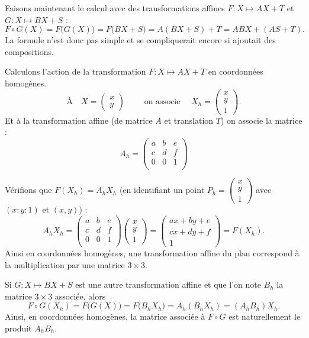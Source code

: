 \documentclass[11pt,class=report,crop=false]{standalone}
\begin{document}
Faisons maintenant le calcul avec des transformations affines $F :  X \mapsto AX+T$ et $G : X \mapsto BX+S$ :
$$F \circ G (X) 
= F\big( G(X) \big) 
= F\big( BX+S \big) 
= A(BX+S) + T
= ABX + (AS+T).$$
La formule n'est donc pas simple et se compliquerait encore si ajoutait des compositions.

Calculons l'action de la transformation $F :  X \mapsto AX+T$ en coordonnées homogènes.
$$\text{À} \quad X = \begin{pmatrix} x \\ y \end{pmatrix}
\qquad \text{ on associe }\quad X_h = \begin{pmatrix} x \\ y \\ 1 \end{pmatrix}.$$
Et à la transformation affine (de matrice $A$ et translation $T$) on associe la matrice :
$$A_h 
=  \begin{pmatrix}
a & b & e \\
c & d & f \\
0 & 0 & 1 \\
\end{pmatrix}$$

Vérifions que $F(X_h) = A_h X_h$ (en identifiant un point $P_h =  \left(\begin{smallmatrix}x\\y\\1\end{smallmatrix}\right)$ avec $(x:y:1)$ et $(x,y)$) :
$$A_h X_h = \begin{pmatrix}
a & b & e \\
c & d & f \\
0 & 0 & 1 \\
\end{pmatrix}
\begin{pmatrix} x \\ y \\ 1 \end{pmatrix}
= \begin{pmatrix} ax + by + e \\ cx + dy + f \\ 1 \end{pmatrix}
= F(X_h).$$
Ainsi en coordonnées homogènes, une transformation affine du plan correspond à la multiplication par une matrice $3\times 3$.

Si $G : X \mapsto BX+S$ est une autre transformation affine et que l'on note $B_h$ la matrice $3 \times 3$ associée, alors 
$$F \circ G (X_h) 
= F\big( G(X) \big) 
= F\big( B_hX_h \big) 
= A_h (B_hX_h)
= (A_hB_h)X_h.$$
Ainsi, en coordonnées homogènes, la matrice associée à $F\circ G$ est naturellement le produit $A_h B_h$.
\end{document}
